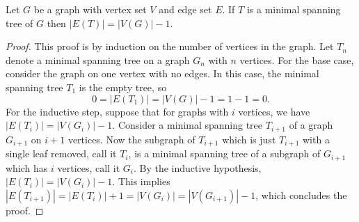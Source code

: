 \documentclass{article}
\begin{document}
\begin{lemma}\label{lem:tree}
  Let $G$ be a graph with vertex set $V$ and edge set $E$.
  If $T$ is a minimal spanning tree of $G$ then $|E(T)| = |V(G)| - 1$.
\end{lemma}
\begin{proof}
  This proof is by induction on the number of vertices in the graph.
  Let $T_n$ denote a minimal spanning tree on a graph $G_n$ with $n$ vertices.
  For the base case, consider the graph on one vertex with no edges.
  In this case, the minimal spanning tree $T_1$ is the empty tree, so
  \begin{equation*}
    0 = |E(T_1)| = |V(G)| - 1 = 1 - 1 = 0.
  \end{equation*}
  For the inductive step, suppose that for graphs with $i$ vertices, we have $|E(T_i)| = |V(G_i)| - 1$.
  Consider a minimal spanning tree $T_{i + 1}$ of a graph $G_{i + 1}$ on $i + 1$ vertices.
  Now the subgraph of $T_{i + 1}$ which is just $T_{i + 1}$ with a single leaf removed, call it $T_i$, is a minimal spanning tree of a subgraph of $G_{i + 1}$ which has $i$ vertices, call it $G_i$.
  By the inductive hypothesis, $|E(T_i)| = |V(G_i)| - 1$.
  This implies $|E(T_{i + 1})| = |E(T_i)| + 1 = |V(G_i)| = |V(G_{i + 1})| - 1$, which concludes the proof.
\end{proof}
\end{document}
